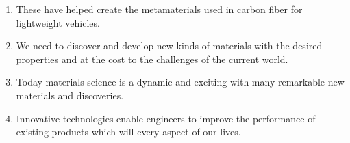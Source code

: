 \begin{enumerate}
      \item These \underline{\hspace{3cm}} have helped create the metamaterials used in carbon fiber \underline{\hspace{1,5cm}} for lightweight vehicles.
      \item We need to discover and develop new kinds of materials with the desired properties and at the \underline{\hspace{3cm}} cost to \underline{\hspace{3cm}} the challenges of the current world.
      \item Today materials science is a dynamic and exciting \underline{\hspace{3cm}} with many remarkable new materials and discoveries.
      \item Innovative technologies enable engineers to improve the performance of existing products which will \underline{\hspace{3cm}} every aspect of our lives.
\end{enumerate}


